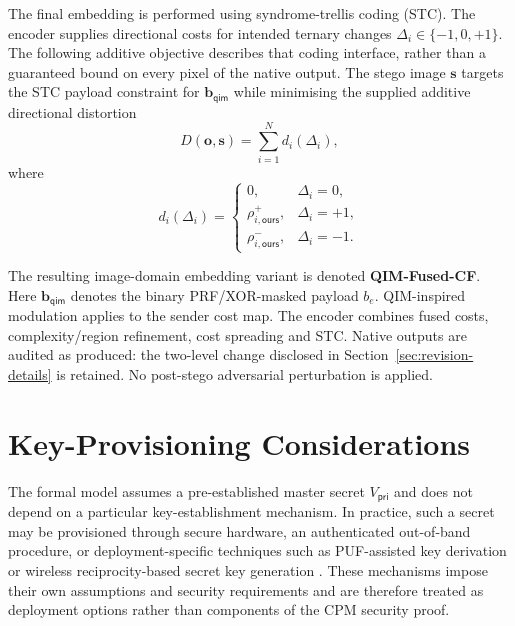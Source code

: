 \documentclass[journal]{IEEEtran}
\theoremstyle{definition}
\theoremstyle{game}
\begin{document}
The final embedding is performed using syndrome-trellis coding (STC). The encoder supplies directional costs for intended ternary changes
$\Delta_i\in\{-1,0,+1\}$. The following additive objective describes
that coding interface, rather than a guaranteed bound on every pixel
of the native output. The stego image $\mathbf{s}$ targets the STC
payload constraint for $\mathbf{b}_{\mathsf{qim}}$ while minimising
the supplied additive directional distortion
\begin{equation}
    D(\mathbf{o},\mathbf{s})
    =
    \sum_{i=1}^{N} d_i(\Delta_i),
    \label{eq:qim_distortion}
\end{equation}
where
\begin{equation}
    d_i(\Delta_i)
    =
    \begin{cases}
    0, & \Delta_i=0,\\
    \rho_{i,\mathsf{ours}}^{+}, & \Delta_i=+1,\\
    \rho_{i,\mathsf{ours}}^{-}, & \Delta_i=-1.
    \end{cases}
    \label{eq:qim_directional_distortion}
\end{equation}

The resulting image-domain embedding variant is denoted \textbf{QIM-Fused-CF}.
Here $\mathbf b_{\mathsf{qim}}$ denotes the binary PRF/XOR-masked
payload $b_e$. QIM-inspired modulation applies to the sender cost map.
The encoder combines fused costs, complexity/region refinement, cost
spreading and STC. Native outputs are audited as produced: the two-level
change disclosed in Section~\ref{sec:revision-details} is retained.
No post-stego adversarial perturbation is applied.


\section{Key-Provisioning Considerations}
\label{subsec:key-provisioning}

The formal model assumes a pre-established master secret
$V_{\mathsf{pri}}$ and does not depend on a particular
key-establishment mechanism. In practice, such a secret may be
provisioned through secure hardware, an authenticated out-of-band
procedure, or deployment-specific techniques such as
PUF-assisted key derivation or wireless reciprocity-based secret
key generation
\cite{holcomb2010power,delvaux2014helper,ye2009infotheoretic,xu2021key}.
These mechanisms impose their own assumptions and security
requirements and are therefore treated as deployment options
rather than components of the CPM security proof.
\end{document}
